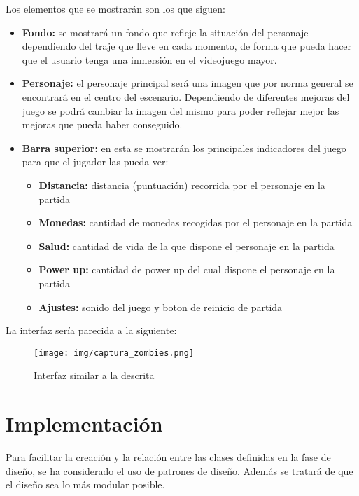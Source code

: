 \documentclass[palatino]{apuntes}
\begin{document}
Los elementos que se mostrarán son los que siguen:
\begin{itemize}
	\item \textbf{Fondo:} se mostrará un fondo que refleje la situación del personaje dependiendo del traje que lleve en cada momento, de forma que pueda hacer que el usuario tenga una inmersión en el videojuego mayor.
	\item \textbf{Personaje:} el personaje principal será una imagen que por norma general se encontrará en el centro del escenario. Dependiendo de diferentes mejoras del juego se podrá cambiar la imagen del mismo para poder reflejar mejor las mejoras que pueda haber conseguido.
	\item \textbf{Barra superior:} en esta se mostrarán los principales indicadores del juego para que el jugador las pueda ver:
		\begin{itemize}
			\item \textbf{Distancia:} distancia (puntuación) recorrida por el personaje en la partida
			\item \textbf{Monedas:} cantidad de monedas recogidas por el personaje en la partida
			\item \textbf{Salud:} cantidad de vida de la que dispone el personaje en la partida
			\item \textbf{Power up:} cantidad de power up del cual dispone el personaje en la partida
			\item \textbf{Ajustes:} sonido del juego y boton de reinicio de partida
			
		\end{itemize}
	
\end{itemize}

La interfaz sería parecida a la siguiente:

\begin{figure}[hbtp]
    \centering
    \texttt{[image: img/captura\_zombies.png]}
    \caption{Interfaz similar a la descrita}
    \label{fig:interfazzombie}
\end{figure}


\chapter{Implementación}
Para facilitar la creación y la relación entre las clases definidas en la fase de diseño, se ha considerado el uso de patrones de diseño. Además se tratará de que el diseño sea lo más modular posible.
\end{document}
